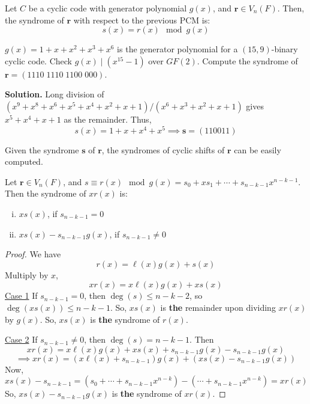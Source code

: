 \begin{thmbox}
    \begin{theorem}
        Let $ C $ be a cyclic code with generator polynomial $ g(x) $, and $ \bm{r}\in V_n(F) $.
        Then, the syndrome of $ \bm{r} $ with respect to the previous PCM is:
        \[ s(x)=r(x)\mod g(x) \]
    \end{theorem}
\end{thmbox}

\begin{exbox}
    \begin{example}
        $ g(x)=1+x+x^2+x^3+x^6 $ is the generator polynomial for a $ (15,9) $-binary cyclic code.
        Check $ g(x)\mid (x^{15}-1) $ over $ GF(2) $. Compute the syndrome of
        $ \bm{r}=(1110\; 1110\; 1100\; 000) $.

        \textbf{Solution.} Long division of $ (x^9+x^8+x^6+x^5+x^4+x^2+x+1)/(x^6+x^3+x^2+x+1) $
        gives $ x^5+x^4+x+1 $ as the remainder. Thus,
        \[ s(x)=1+x+x^4+x^5\implies \bm{s}=(110011) \]
    \end{example}
\end{exbox}

\begin{remark}
    Given the syndrome $ \bm{s} $ of $ \bm{r} $, the syndromes of cyclic shifts of $ \bm{r} $
    can be easily computed.
\end{remark}

\begin{thmbox}
    \begin{theorem}
        Let $ \bm{r}\in V_n(F) $, and $ s\equiv r(x)\mod g(x)=s_0+xs_1+\cdots+s_{n-k-1}x^{n-k-1} $.
        Then the syndrome of $ xr(x) $ is:
        \begin{enumerate}[(i)]
            \item $ xs(x) $, if $ s_{n-k-1}=0 $
            \item $ xs(x)-s_{n-k-1}g(x) $, if $ s_{n-k-1}\neq 0 $
        \end{enumerate}
    \end{theorem}
\end{thmbox}

\begin{proof}
    We have
    \[ r(x)=\ell (x)g(x)+s(x) \]
    Multiply by $ x $,
    \[ xr(x)=x\ell(x)g(x)+xs(x) \]
    \underline{Case 1} If $ s_{n-k-1}=0 $, then $ \deg(s)\leqslant n-k-2 $,
    so $ \deg(xs(x))\leqslant n-k-1 $. So, $ xs(x) $ is \textbf{the} remainder upon dividing
    $ xr(x) $ by $ g(x) $. So, $ xs(x) $ is \textbf{the} syndrome of $ r(x) $.

    \underline{Case 2} If $ s_{n-k-1}\neq 0 $, then $ \deg(s)=n-k-1 $. Then
    \[ xr(x)=x\ell(x)g(x)+xs(x)+s_{n-k-1}g(x)-s_{n-k-1}g(x) \]
    \[ \implies xr(x)=(x\ell(x)+s_{n-k-1})g(x)+(xs(x)-s_{n-k-1}g(x)) \]
    Now,
    \[ xs(x)-s_{n-k-1}=(s_0+\cdots+s_{n-k-1}x^{n-k})-(\cdots+s_{n-k-1}x^{n-k})=xr(x) \]
    So, $ xs(x)-s_{n-k-1}g(x) $ is \textbf{the} syndrome of $ xr(x) $.
\end{proof}
